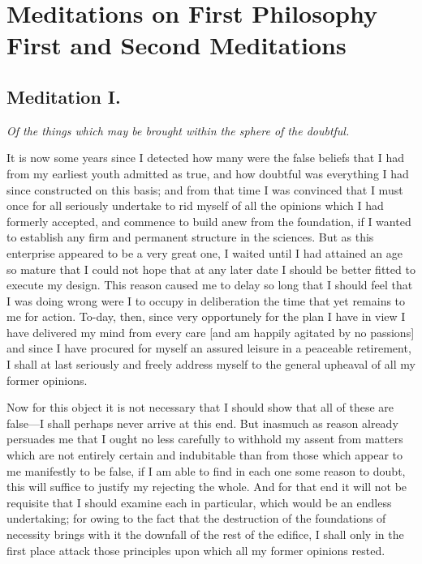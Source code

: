 
\author{Ren\'e Descartes}
\chapter[Ren\'e Descartes -- Meditiations on First Philosophy, 1 and
2]{Meditations on First Philosophy\\\smaller First and Second
Meditations}


\section*{Meditation I.}

\begin{center}\textit{Of the things which may be brought within the
sphere of the doubtful.}\end{center}

It is now some years since I detected how many were the false beliefs
that I had from my earliest youth admitted as true, and how doubtful
was everything I had since constructed on this basis; and from that
time I was convinced that I must once for all seriously undertake to
rid myself of all the opinions which I had formerly accepted, and
commence to build anew from the foundation, if I wanted to establish
any firm and permanent structure in the sciences. But as this
enterprise appeared to be a very great one, I waited until I had
attained an age so mature that I could not hope that at any later date
I should be better fitted to execute my design. This reason caused me
to delay so long that I should feel that I was doing wrong were I to
occupy in deliberation the time that yet remains to me for action.
To-day, then, since very opportunely for the plan I have in view I
have delivered my mind from every care [and am happily agitated by no
passions] and since I have procured for myself an assured leisure in a
peaceable retirement, I shall at last seriously and freely address
myself to the general upheaval of all my former opinions.

Now for this object it is not necessary that I should show
that all of these are false---I shall perhaps never arrive at this
end. But inasmuch as reason already persuades me that I ought no less
carefully to withhold my assent from matters which are not entirely
certain and indubitable than from those which appear to me
manifestly to be false, if I am able to find in each one some reason
to doubt, this will suffice to justify my rejecting the whole. And for
that end it will not be requisite that I should examine each in
particular, which would be an endless undertaking; for owing to the
fact that the destruction of the foundations of necessity brings with
it the downfall of the rest of the edifice, I shall only in the first
place attack those principles upon which all my former opinions
rested.

